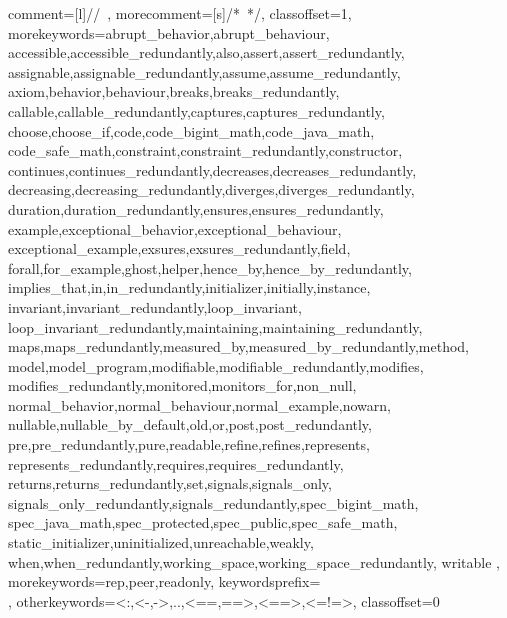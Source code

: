        {%
        comment=[l]{//\ },
        morecomment=[s]{/*\ }{*/},
        classoffset=1,
        morekeywords={abrupt_behavior,abrupt_behaviour,
         accessible,accessible_redundantly,also,assert,assert_redundantly,
         assignable,assignable_redundantly,assume,assume_redundantly,
         axiom,behavior,behaviour,breaks,breaks_redundantly,
         callable,callable_redundantly,captures,captures_redundantly,
         choose,choose_if,code,code_bigint_math,code_java_math,
         code_safe_math,constraint,constraint_redundantly,constructor,
         continues,continues_redundantly,decreases,decreases_redundantly,
         decreasing,decreasing_redundantly,diverges,diverges_redundantly,
         duration,duration_redundantly,ensures,ensures_redundantly,
         example,exceptional_behavior,exceptional_behaviour,
         exceptional_example,exsures,exsures_redundantly,field,
         forall,for_example,ghost,helper,hence_by,hence_by_redundantly,
         implies_that,in,in_redundantly,initializer,initially,instance,
         invariant,invariant_redundantly,loop_invariant,
         loop_invariant_redundantly,maintaining,maintaining_redundantly,
         maps,maps_redundantly,measured_by,measured_by_redundantly,method,
         model,model_program,modifiable,modifiable_redundantly,modifies,
         modifies_redundantly,monitored,monitors_for,non_null,
         normal_behavior,normal_behaviour,normal_example,nowarn,
         nullable,nullable_by_default,old,or,post,post_redundantly,
         pre,pre_redundantly,pure,readable,refine,refines,represents,
         represents_redundantly,requires,requires_redundantly,
         returns,returns_redundantly,set,signals,signals_only,
         signals_only_redundantly,signals_redundantly,spec_bigint_math,
         spec_java_math,spec_protected,spec_public,spec_safe_math,
         static_initializer,uninitialized,unreachable,weakly,
         when,when_redundantly,working_space,working_space_redundantly,
         writable
        },
        morekeywords={rep,peer,readonly},
        keywordsprefix=\\,
        otherkeywords={<:,<-,->,..,<==,==>,<==>,<=!=>},
        classoffset=0 %
}
